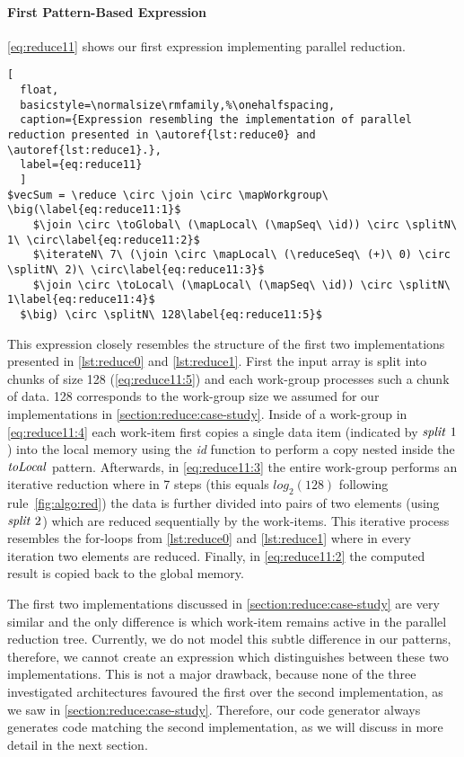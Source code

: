\paragraph{First Pattern-Based Expression}
\autoref{eq:reduce11} shows our first expression implementing parallel reduction.
\begin{lstlisting}[
  float,
  basicstyle=\normalsize\rmfamily,%\onehalfspacing,
  caption={Expression resembling the implementation of parallel reduction presented in \autoref{lst:reduce0} and \autoref{lst:reduce1}.},
  label={eq:reduce11}
  ]
$vecSum = \reduce \circ \join \circ \mapWorkgroup\ \big(\label{eq:reduce11:1}$
    $\join \circ \toGlobal\ (\mapLocal\ (\mapSeq\ \id)) \circ \splitN\ 1\ \circ\label{eq:reduce11:2}$
    $\iterateN\ 7\ (\join \circ \mapLocal\ (\reduceSeq\ (+)\ 0) \circ \splitN\ 2)\ \circ\label{eq:reduce11:3}$
    $\join \circ \toLocal\ (\mapLocal\ (\mapSeq\ \id)) \circ \splitN\ 1\label{eq:reduce11:4}$
  $\big) \circ \splitN\ 128\label{eq:reduce11:5}$
\end{lstlisting}
%
This expression closely resembles the structure of the first two implementations presented in \autoref{lst:reduce0} and \autoref{lst:reduce1}.
First the input array is split into chunks of size 128 (\autoref{eq:reduce11:5}) and each work-group processes such a chunk of data.
128 corresponds to the work-group size we assumed for our implementations in \autoref{section:reduce:case-study}.
Inside of a work-group in \autoref{eq:reduce11:4} each work-item first copies a single data item (indicated by $\text{\textit{split}}\ 1$) into the local memory using the \textit{id} function to perform a copy nested inside the $\text{\textit{toLocal}}$ pattern.
Afterwards, in \autoref{eq:reduce11:3} the entire work-group performs an iterative reduction where in 7 steps (this equals $log_2(128)$ following rule~\ref{fig:algo:red}) the data is further divided into pairs of two elements (using $\text{\textit{split}}\ 2$) which are reduced sequentially by the work-items.
This iterative process resembles the for-loops from \autoref{lst:reduce0} and \autoref{lst:reduce1} where in every iteration two elements are reduced.
Finally, in \autoref{eq:reduce11:2} the computed result is copied back to the global memory.

The first two implementations discussed in \autoref{section:reduce:case-study} are very similar and the only difference is which work-item remains active in the parallel reduction tree.
Currently, we do not model this subtle difference in our patterns, therefore, we cannot create an expression which distinguishes between these two implementations.
This is not a major drawback, because none of the three investigated architectures favoured the first over the second implementation, as we saw in \autoref{section:reduce:case-study}.
Therefore, our code generator always generates code matching the second implementation, as we will discuss in more detail in the next section.


